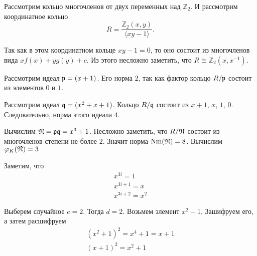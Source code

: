 \documentclass[_00_dissertation.tex]{subfiles}
\begin{document}
\begin{example}
	Рассмотрим кольцо многочленов от двух переменных над $\mathbb{Z}_2$. И рассмотрим координатное кольцо
	\begin{equation*}
		R = \frac{\mathbb{Z}_2(x, y)}{\langle xy - 1\rangle}.
	\end{equation*}
	
	Так как в этом координатном кольце $xy - 1 = 0$, то оно состоит из многочленов вида $xf(x) + yg(y) + c$.
	Из этого несложно заметить, что $R \cong \mathbb{Z}_2(x, x^{-1})$.
	
	Рассмотрим идеал $\mathfrak{p} = (x + 1)$.
	Его норма $2$, так как фактор кольцо $R/\mathfrak{p}$ состоит из элементов $0$ и $1$.
	
	Рассмотрим идеал $\mathfrak{q} = (x^2 + x + 1)$.
	Кольцо $R/\mathfrak{q}$ состоит из $x+1$, $x$, $1$, $0$.
	Следовательно, норма этого идеала $4$.

	Вычислим $\mathfrak{N} = \mathfrak{p}\mathfrak{q} = x^3 + 1$.
	Несложно заметить, что $R/\mathfrak{N}$ состоит из многочленов степени не более $2$.
	Значит норма $\textrm{Nm}(\mathfrak{N}) = 8$.
	Вычислим $\varphi_K(\mathfrak{N}) = 3$

	Заметим, что
	\begin{equation*}
		\begin{array}{l}
			x^{3i} = 1\\
			x^{3i+1} = x\\
			x^{3i+2} = x^2
		\end{array}
	\end{equation*}

	Выберем случайное $e = 2$.
	Тогда $d = 2$.
	Возьмем элемент $x^2 + 1$.
	Зашифруем его, а затем расшифруем
	\begin{equation*}
	    \begin{split}
    		(x^2 + 1)^2 = x^4 + 1 = x + 1\\
	        (x + 1)^2 = x^2 + 1
	    \end{split}
	\end{equation*}
\end{example}

\onlyinsubfile{
    
    
}
\end{document}
